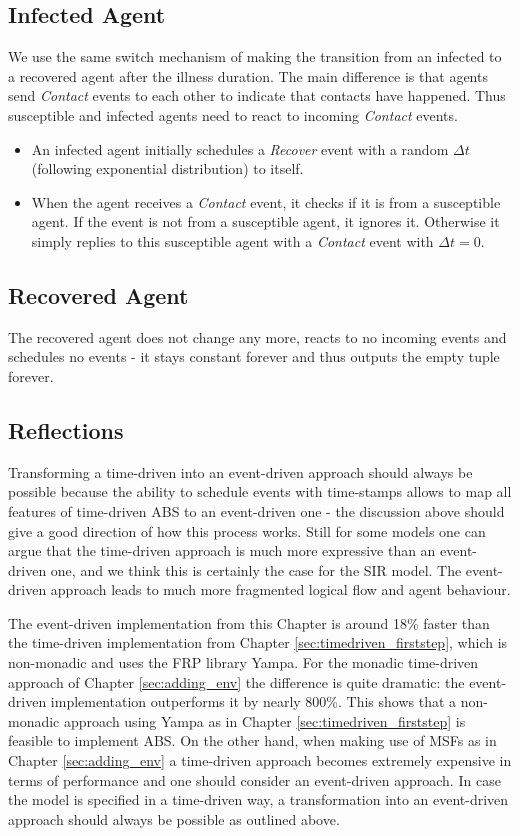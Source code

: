 \subsection{Infected Agent}
We use the same switch mechanism of making the transition from an infected to a recovered agent after the illness duration. The main difference is that agents send \textit{Contact} events to each other to indicate that contacts have happened. Thus susceptible and infected agents need to react to incoming \textit{Contact} events.

\begin{itemize}
	\item An infected agent initially schedules a \textit{Recover} event with a random $\Delta t$ (following exponential distribution) to itself.
	\item When the agent receives a \textit{Contact} event, it checks if it is from a susceptible agent. If the event is not from a susceptible agent, it ignores it. Otherwise it simply replies to this susceptible agent with a \textit{Contact} event with $\Delta t = 0$.
\end{itemize}

\subsection{Recovered Agent}
The recovered agent does not change any more, reacts to no incoming events and schedules no events - it stays constant forever and thus outputs the empty tuple forever.

\subsection{Reflections}
Transforming a time-driven into an event-driven approach should always be possible because the ability to schedule events with time-stamps allows to map all features of time-driven ABS to an event-driven one - the discussion above should give a good direction of how this process works. Still for some models one can argue that the time-driven approach is much more expressive than an event-driven one, and we think this is certainly the case for the SIR model. The event-driven approach leads to much more fragmented logical flow and agent behaviour.

The event-driven implementation from this Chapter is around 18\% faster than the time-driven implementation from Chapter \ref{sec:timedriven_firststep}, which is non-monadic and uses the FRP library Yampa. For the monadic time-driven approach of Chapter \ref{sec:adding_env} the difference is quite dramatic: the event-driven implementation outperforms it by nearly 800\%. This shows that a non-monadic approach using Yampa as in Chapter \ref{sec:timedriven_firststep} is feasible to implement ABS. On the other hand, when making use of MSFs as in Chapter \ref{sec:adding_env} a time-driven approach becomes extremely expensive in terms of performance and one should consider an event-driven approach. In case the model is specified in a time-driven way, a transformation into an event-driven approach should always be possible as outlined above.